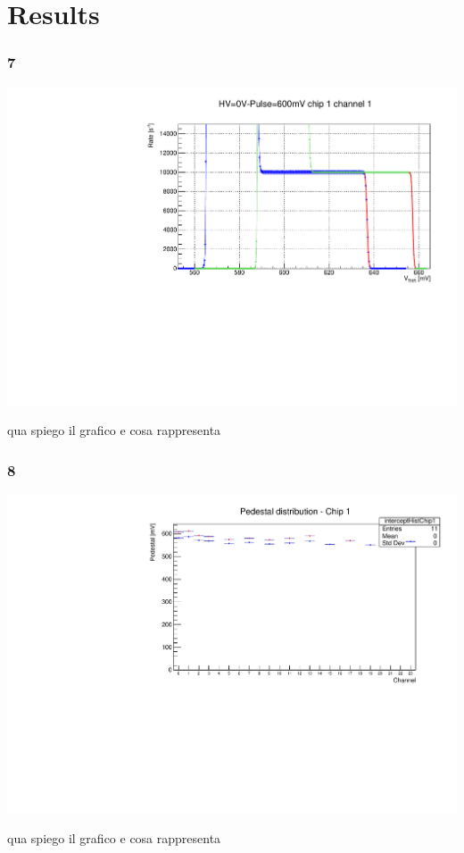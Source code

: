 \documentclass[aspectratio=169]{beamer}
\begin{document}
	\section{Results}
	
	\begin{frame}
	\frametitle{7 }
	
		\begin{center}
			\includegraphics[width=0.75 \textwidth]{IMG/ThScan_ch0.pdf}
		\end{center}
	
	\color{red}  qua spiego il grafico e cosa rappresenta
	
	\end{frame}

	\begin{frame}
	\frametitle{8 }
	
	\begin{center}
		\includegraphics[width=0.75 \textwidth]{IMG/TB1-DAC0-DAC63.pdf}
	\end{center}
	
	\color{red}  qua spiego il grafico e cosa rappresenta
	
	\end{frame}
\end{document}
